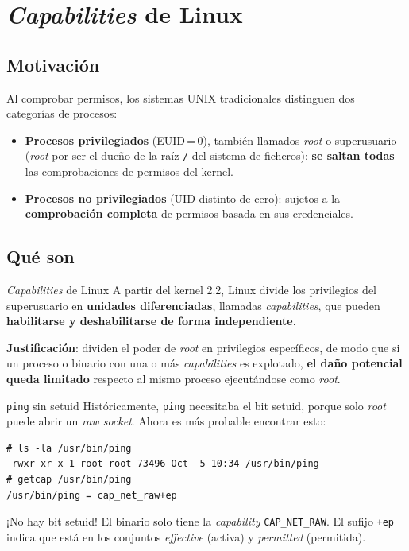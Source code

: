 \documentclass[11pt,a4paper]{report}
\begin{document}
\chapter{\emph{Capabilities} de Linux}\label{cap:capabilities}
 
\section{Motivación}
 
Al comprobar permisos, los sistemas UNIX tradicionales distinguen dos categorías de procesos:
\begin{itemize}
  \item \textbf{Procesos privilegiados} (EUID\,=\,0), también llamados \emph{root} o superusuario (\emph{root} por ser el dueño de la raíz \texttt{/} del sistema de ficheros): \textbf{se saltan todas} las comprobaciones de permisos del kernel.
  \item \textbf{Procesos no privilegiados} (UID distinto de cero): sujetos a la \textbf{comprobación completa} de permisos basada en sus credenciales.
\end{itemize}
 
\section{Qué son}
 
\begin{definicion}{\emph{Capabilities} de Linux}
A partir del kernel 2.2, Linux divide los privilegios del superusuario en \textbf{unidades diferenciadas}, llamadas \emph{capabilities}, que pueden \textbf{habilitarse y deshabilitarse de forma independiente}.
\end{definicion}
 
\textbf{Justificación}: dividen el poder de \emph{root} en privilegios específicos, de modo que si un proceso o binario con una o más \emph{capabilities} es explotado, \textbf{el daño potencial queda limitado} respecto al mismo proceso ejecutándose como \emph{root}.
 
\begin{ejemplo}{\texttt{ping} sin setuid}
Históricamente, \texttt{ping} necesitaba el bit setuid, porque solo \emph{root} puede abrir un \emph{raw socket}. Ahora es más probable encontrar esto:
\begin{verbatim}
# ls -la /usr/bin/ping
-rwxr-xr-x 1 root root 73496 Oct  5 10:34 /usr/bin/ping
# getcap /usr/bin/ping
/usr/bin/ping = cap_net_raw+ep
\end{verbatim}
¡No hay bit setuid! El binario solo tiene la \emph{capability} \texttt{CAP\_NET\_RAW}. El sufijo \texttt{+ep} indica que está en los conjuntos \emph{effective} (activa) y \emph{permitted} (permitida).
\end{ejemplo}
 
\end{document}
